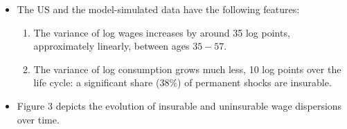 \documentclass[notes=show]{beamer}
\begin{document}
\bigskip

\begin{frame}%


\begin{center}
\end{center}

\transboxout%
\end{frame}%

\bigskip

\begin{frame}%


\begin{itemize}
\item The US and the model-simulated data have the following features:

\begin{enumerate}
\item The variance of log wages increases by around 35 log points,
approximately linearly, between ages $35-57$.

\item The variance of log consumption grows much less, 10 log points over
the life cycle: a significant share ($38\%$) of permanent shocks are
insurable.
\end{enumerate}

\item Figure 3 depicts the evolution of insurable and uninsurable wage
dispersions over time.
\end{itemize}

\transboxout%
\end{frame}%
\end{document}
